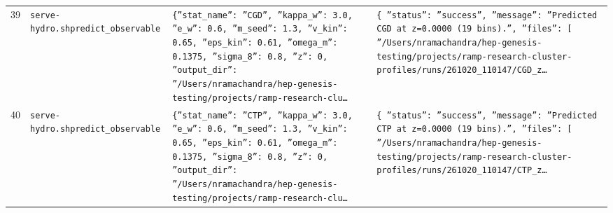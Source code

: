 \documentclass[11pt,a4paper]{article}
\begin{document}
\begin{longtable}{@{}p{}p{}p{}p{}@{}}
39 & \texttt{serve-hydro.sh}\newline\texttt{predict\_\allowbreak{}observable} & \texttt{\{''stat\_\allowbreak{}name'':\allowbreak{} ''CGD'',\allowbreak{} ''kappa\_\allowbreak{}w'':\allowbreak{} 3.0,\allowbreak{} ''e\_\allowbreak{}w'':\allowbreak{} 0.6,\allowbreak{} ''m\_\allowbreak{}seed'':\allowbreak{} 1.3,\allowbreak{} ''v\_\allowbreak{}kin'':\allowbreak{} 0.65,\allowbreak{} ''eps\_\allowbreak{}kin'':\allowbreak{} 0.61,\allowbreak{} ''omega\_\allowbreak{}m'':\allowbreak{} 0.1375,\allowbreak{} ''sigma\_\allowbreak{}8'':\allowbreak{} 0.8,\allowbreak{} ''z'':\allowbreak{} 0,\allowbreak{} ''output\_\allowbreak{}dir'':\allowbreak{} ''/\allowbreak{}Users/\allowbreak{}nramachandra/\allowbreak{}hep-genesis-testing/\allowbreak{}projects/\allowbreak{}ramp-research-clu\ldots{}\allowbreak{}} & \texttt{\{   ''status'':\allowbreak{} ''success'',\allowbreak{}   ''message'':\allowbreak{} ''Predicted CGD at z=\allowbreak{}0.0000 (19 bins)\allowbreak{}.'',\allowbreak{}   ''files'':\allowbreak{} [     ''/\allowbreak{}Users/\allowbreak{}nramachandra/\allowbreak{}hep-genesis-testing/\allowbreak{}projects/\allowbreak{}ramp-research-cluster-profiles/\allowbreak{}runs/\allowbreak{}261020\_\allowbreak{}110147/\allowbreak{}CGD\_\allowbreak{}z\ldots{}\allowbreak{}} \\
40 & \texttt{serve-hydro.sh}\newline\texttt{predict\_\allowbreak{}observable} & \texttt{\{''stat\_\allowbreak{}name'':\allowbreak{} ''CTP'',\allowbreak{} ''kappa\_\allowbreak{}w'':\allowbreak{} 3.0,\allowbreak{} ''e\_\allowbreak{}w'':\allowbreak{} 0.6,\allowbreak{} ''m\_\allowbreak{}seed'':\allowbreak{} 1.3,\allowbreak{} ''v\_\allowbreak{}kin'':\allowbreak{} 0.65,\allowbreak{} ''eps\_\allowbreak{}kin'':\allowbreak{} 0.61,\allowbreak{} ''omega\_\allowbreak{}m'':\allowbreak{} 0.1375,\allowbreak{} ''sigma\_\allowbreak{}8'':\allowbreak{} 0.8,\allowbreak{} ''z'':\allowbreak{} 0,\allowbreak{} ''output\_\allowbreak{}dir'':\allowbreak{} ''/\allowbreak{}Users/\allowbreak{}nramachandra/\allowbreak{}hep-genesis-testing/\allowbreak{}projects/\allowbreak{}ramp-research-clu\ldots{}\allowbreak{}} & \texttt{\{   ''status'':\allowbreak{} ''success'',\allowbreak{}   ''message'':\allowbreak{} ''Predicted CTP at z=\allowbreak{}0.0000 (19 bins)\allowbreak{}.'',\allowbreak{}   ''files'':\allowbreak{} [     ''/\allowbreak{}Users/\allowbreak{}nramachandra/\allowbreak{}hep-genesis-testing/\allowbreak{}projects/\allowbreak{}ramp-research-cluster-profiles/\allowbreak{}runs/\allowbreak{}261020\_\allowbreak{}110147/\allowbreak{}CTP\_\allowbreak{}z\ldots{}\allowbreak{}} \\

\end{longtable}
\end{document}

